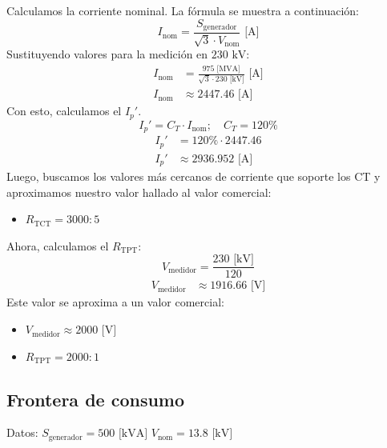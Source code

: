 Calculamos la corriente nominal. La fórmula se muestra a continuación:
\begin{equation}
    I_{\text{nom}} = \frac{S_{\text{generador}}}{\sqrt{3} \cdot V_{\text{nom}}} \text{ [A]}
\end{equation}
Sustituyendo valores para la medición en $230 \text{ kV}$:
\begin{align*}
    I_{\text{nom}} &= \frac{975 \text{ [MVA]}}{\sqrt{3} \cdot 230 \text{ [kV]}} \text{ [A]} \\
    I_{\text{nom}} &\approx 2447.46 \text{ [A]}
\end{align*}
Con esto, calculamos el $I_{p}'$.
\begin{equation}
    I_{p}' = C_T \cdot I_{\text{nom}} ; \quad C_T = 120\%
\end{equation}
\begin{align*}
    I_{p}' &= 120\% \cdot 2447.46 \\
    I_{p}' &\approx 2936.952 \text{ [A]}
\end{align*}
Luego, buscamos los valores más cercanos de corriente que soporte los CT y aproximamos nuestro valor hallado al valor comercial:
\begin{itemize}
    \item $R_{\text{TCT}} = 3000:5$
\end{itemize}
Ahora, calculamos el $R_{\text{TPT}}$:
\begin{equation}
    V_{\text{medidor}} = \frac{230 \text{ [kV]}}{120}
\end{equation}
\begin{align*}
    V_{\text{medidor}} &\approx 1916.66 \text{ [V]}
\end{align*}
Este valor se aproxima a un valor comercial:
\begin{itemize}
    \item $V_{\text{medidor}} \approx 2000 \text{ [V]}$
    \item $R_{\text{TPT}} = 2000:1$
\end{itemize}

\subsection{Frontera de consumo}
Datos:
$S_{\text{generador}} = 500 \text{ [kVA]}$
$V_{\text{nom}} = 13.8 \text{ [kV]}$

